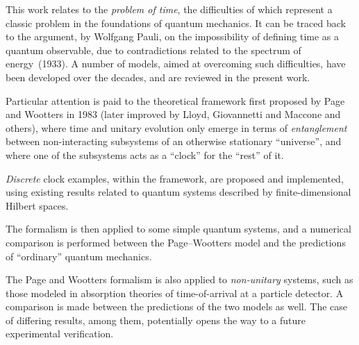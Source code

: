 This work relates to the
\emph{problem of time},
the difficulties of which
represent a classic problem in the foundations of quantum mechanics.
It can be traced back to
the argument, by Wolfgang Pauli,
on the impossibility of defining time as a quantum observable,
due to contradictions related to the spectrum of energy~(1933).
A number of models, aimed at overcoming such difficulties,
have been developed over the decades,
and are reviewed in the present work.

Particular attention is paid to 
the theoretical framework first proposed by Page and Wootters in 1983
(later improved by Lloyd, Giovannetti and Maccone and others),
where time and unitary evolution only emerge in
terms of \emph{entanglement} between non-interacting subsystems
of an otherwise stationary ``universe'',
and where one of the subsystems acts as a ``clock'' for the ``rest'' of it.

\emph{Discrete} clock examples, within the framework, are proposed and implemented,
using
existing results related to quantum systems described by finite-dimensional Hilbert spaces.

The formalism is then applied to some simple quantum systems,
and a numerical comparison is performed between the Page--Wootters model and the predictions
of ``ordinary'' quantum mechanics.

The Page and Wootters formalism is also applied to \emph{non-unitary} systems,
such as those modeled in absorption theories of time-of-arrival at a particle detector.
A comparison is made between the predictions of the two models as well.
The case of differing results, among them, potentially opens the way to a future experimental verification.
